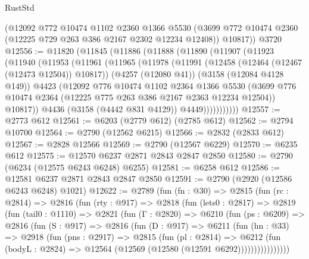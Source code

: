 \begin{lexlean}{RustStd}
\begin{coremodule}
      (@12092
        @772
        @10474
        @1102
        @2360
        @1366
        @5530
        (@3699 @772 @10474 @2360 (@12225 @729 @263 @386 @2167 @2302 @12234 @12408))
        @10817))
    @3720
@12556 := @11820
    (@11845
      (@11886
        (@11888
          (@11890
            (@11907
              (@11923
                (@11940
                  (@11953
                    (@11961
                      (@11965
                        (@11978
                          (@11991
                            (@12458 (@12464 (@12467 (@12473 @12504)) @10817))
                            (@4257 (@12080 @41))
                            (@3158 (@12084 @4128 @149))
                            @4423
                            (@12092
                              @776
                              @10474
                              @1102
                              @2364
                              @1366
                              @5530
                              (@3699
                                @776
                                @10474
                                @2364
                                (@12225 @775 @263 @386 @2167 @2363 @12234 @12504))
                              @10817))
                          @4436
                          (@3158 (@4442 @831 @4129))
                          @4449)))))))))))
@12557 := @2773 @612
@12561 := @6203 (@2779 @612) (@2785 @612)
@12562 := @2794 @10700
@12564 := @2790 (@12562 @6215)
@12566 := @2832 (@2833 @612)
@12567 := @2828 @12566
@12569 := @2790 (@12567 @6229)
@12570 := @6235 @612
@12575 := @12570 @6237 @2871 @2843 @2847 @2850
@12580 := @2790 (@6234 (@12575 @6243 @6248) @6255)
@12581 := @6258 @612
@12586 := @12581 @6237 @2871 @2843 @2847 @2850
@12591 := @2790 (@2920 (@12586 @6243 @6248) @1021)
@12622 := @2789
    (fun (fn : @30) =>
    @2815
      (fun (rc : @2814) =>
      @2816
        (fun (rty : @917) =>
        @2818
          (fun (lets0 : @2817) =>
          @2819
            (fun (tail0 : @1110) =>
            @2821
              (fun (Γ : @2820) =>
              @6210
                (fun (ps : @6209) =>
                @2816
                  (fun (S : @917) =>
                  @2816
                    (fun (D : @917) =>
                    @6211
                      (fun (hn : @33) =>
                      @2918
                        (fun (pns : @2917) =>
                        @2815
                          (fun (pl : @2814) =>
                          @6212
                            (fun (bodyL : @2824) =>
                            @12564 (@12569 (@12580 (@12591 @6292))))))))))))))))

\end{coremodule}
\end{lexlean}
